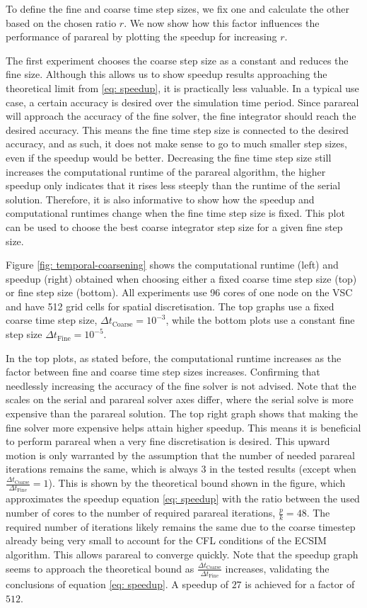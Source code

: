 To define the fine and coarse time step sizes, we fix one and calculate the other based on the chosen ratio $r$. We now show how this factor influences the performance of parareal by plotting the speedup for increasing $r$.

The first experiment chooses the coarse step size as a constant and reduces the fine size. Although this allows us to show speedup results approaching the theoretical limit from \ref{eq: speedup}, it is practically less valuable. In a typical use case, a certain accuracy is desired over the simulation time period. Since parareal will approach the accuracy of the fine solver, the fine integrator should reach the desired accuracy. This means the fine time step size is connected to the desired accuracy, and as such, it does not make sense to go to much smaller step sizes, even if the speedup would be better. Decreasing the fine time step size still increases the computational runtime of the parareal algorithm, the higher speedup only indicates that it rises less steeply than the runtime of the serial solution. Therefore, it is also informative to show how the speedup and computational runtimes change when the fine time step size is fixed. This plot can be used to choose the best coarse integrator step size for a given fine step size.

Figure \ref{fig: temporal-coarsening} shows the computational runtime (left) and speedup (right) obtained when choosing either a fixed coarse time step size (top) or fine step size (bottom). All experiments use 96 cores of one node on the VSC and have 512 grid cells for spatial discretisation. The top graphs use a fixed coarse time step size, $\Delta t_\mathrm{Coarse} = 10^{-3}$, while the bottom plots use a constant fine step size $\Delta t_\mathrm{Fine} = 10^{-5}$. 

In the top plots, as stated before, the computational runtime increases as the factor between fine and coarse time step sizes increases. Confirming that needlessly increasing the accuracy of the fine solver is not advised. Note that the scales on the serial and parareal solver axes differ, where the serial solve is more expensive than the parareal solution. 
The top right graph shows that making the fine solver more expensive helps attain higher speedup. This means it is beneficial to perform parareal when a very fine discretisation is desired. This upward motion is only warranted by the assumption that the number of needed parareal iterations remains the same, which is always $3$ in the tested results (except when $\frac{\Delta t_\mathrm{Coarse}}{\Delta t_\mathrm{Fine}}=1$). This is shown by the theoretical bound shown in the figure, which approximates the speedup equation \ref{eq: speedup} with the ratio between the used number of cores to the number of required parareal iterations, $\frac{p}{k} = 48$. The required number of iterations likely remains the same due to the coarse timestep already being very small to account for the CFL conditions of the ECSIM algorithm. This allows parareal to converge quickly. Note that the speedup graph seems to approach the theoretical bound as $\frac{\Delta t_\mathrm{Coarse}}{\Delta t_\mathrm{Fine}}$ increases, validating the conclusions of equation \ref{eq: speedup}. A speedup of $27$ is achieved for a factor of $512$.

